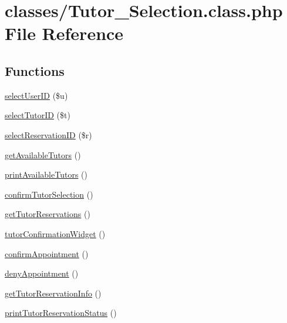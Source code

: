 \hypertarget{_tutor___selection_8class_8php}{}\section{classes/\+Tutor\+\_\+\+Selection.class.\+php File Reference}
\label{_tutor___selection_8class_8php}
\subsection*{Functions}
\begin{DoxyCompactItemize}
\item 
\mbox{\hyperlink{_tutor___selection_8class_8php_abe3cd5bb61d47a195d45d6f2dd6477c6}{select\+User\+ID}} (\$u)
\item 
\mbox{\hyperlink{_tutor___selection_8class_8php_abd658239b3f73bb1c30c51b4f4c4f2a2}{select\+Tutor\+ID}} (\$t)
\item 
\mbox{\hyperlink{_tutor___selection_8class_8php_a78fc1624ae4a44a300484ac00e0b9a96}{select\+Reservation\+ID}} (\$r)
\item 
\mbox{\hyperlink{_tutor___selection_8class_8php_a82ba4a18d02d84b563e0ed644c4a846e}{get\+Available\+Tutors}} ()
\item 
\mbox{\hyperlink{_tutor___selection_8class_8php_a917e4fb0b95699badf69324e683ef2f9}{print\+Available\+Tutors}} ()
\item 
\mbox{\hyperlink{_tutor___selection_8class_8php_aca7f4f4fe9e0cde1169098ed7bb363df}{confirm\+Tutor\+Selection}} ()
\item 
\mbox{\hyperlink{_tutor___selection_8class_8php_a8297068ed77f57ec6bd722bdffda73b4}{get\+Tutor\+Reservations}} ()
\item 
\mbox{\hyperlink{_tutor___selection_8class_8php_ac3d759ab05a37faccd599d582b1eccda}{tutor\+Confirmation\+Widget}} ()
\item 
\mbox{\hyperlink{_tutor___selection_8class_8php_a49550acc8d52a9fc8ef060230adfa71e}{confirm\+Appointment}} ()
\item 
\mbox{\hyperlink{_tutor___selection_8class_8php_a5d29ebf3838fdcd42ffe4db5d4fb4308}{deny\+Appointment}} ()
\item 
\mbox{\hyperlink{_tutor___selection_8class_8php_aa55c439250d7b602d25701d20080575c}{get\+Tutor\+Reservation\+Info}} ()
\item 
\mbox{\hyperlink{_tutor___selection_8class_8php_a8d1cd85c5c7884b46ddce6e94f0bc585}{print\+Tutor\+Reservation\+Status}} ()
\end{DoxyCompactItemize}

